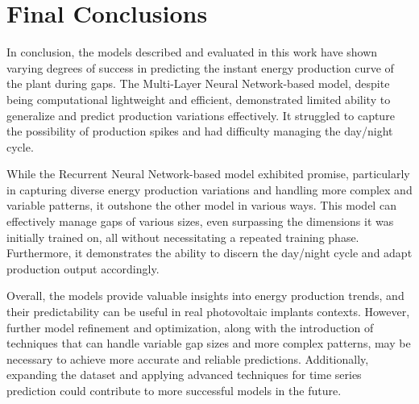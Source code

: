 \section{Final Conclusions}


In conclusion, the models described and evaluated in this work have shown varying degrees of success in predicting the instant energy production curve of the plant during gaps. The Multi-Layer Neural Network-based model, despite being computational lightweight and efficient, demonstrated limited ability to generalize and predict production variations effectively. It struggled to capture the possibility of production spikes and had difficulty managing the day/night cycle.

While the Recurrent Neural Network-based model exhibited promise, particularly in capturing diverse energy production variations and handling more complex and variable patterns, it outshone the other model in various ways. This model can effectively manage gaps of various sizes, even surpassing the dimensions it was initially trained on, all without necessitating a repeated training phase. Furthermore, it demonstrates the ability to discern the day/night cycle and adapt production output accordingly.

Overall, the models provide valuable insights into energy production trends, and their predictability can be useful in real photovoltaic implants contexts. However, further model refinement and optimization, along with the introduction of techniques that can handle variable gap sizes and more complex patterns, may be necessary to achieve more accurate and reliable predictions. Additionally, expanding the dataset and applying advanced techniques for time series prediction could contribute to more successful models in the future.